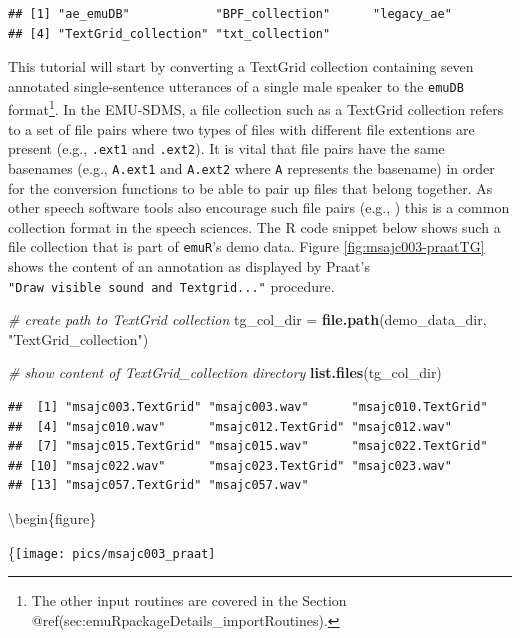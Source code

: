 \documentclass[]{book}
\newenvironment{Shaded}{\begin{snugshade}}{\end{snugshade}}
\newcommand{\CommentTok}[1]{\textcolor[rgb]{0.56,0.35,0.01}{\textit{#1}}}
\newcommand{\KeywordTok}[1]{\textcolor[rgb]{0.13,0.29,0.53}{\textbf{#1}}}
\newcommand{\NormalTok}[1]{#1}
\newcommand{\StringTok}[1]{\textcolor[rgb]{0.31,0.60,0.02}{#1}}
\let\rmarkdownfootnote\footnote%
\def\footnote{\protect\rmarkdownfootnote}
\begin{document}
\begin{verbatim}
## [1] "ae_emuDB"            "BPF_collection"      "legacy_ae"          
## [4] "TextGrid_collection" "txt_collection"
\end{verbatim}

This tutorial will start by converting a TextGrid collection containing seven annotated single-sentence utterances of a single male speaker to the \texttt{emuDB} format\footnote{The other input routines are covered in the Section @ref(sec:emuRpackageDetails\_importRoutines).}. In the EMU-SDMS, a file collection such as a TextGrid collection refers to a set of file pairs where two types of files with different file extentions are present (e.g., \texttt{.ext1} and \texttt{.ext2}). It is vital that file pairs have the same basenames (e.g., \texttt{A.ext1} and \texttt{A.ext2} where \texttt{A} represents the basename) in order for the conversion functions to be able to pair up files that belong together. As other speech software tools also encourage such file pairs (e.g., \citet{kisler:2015a}) this is a common collection format in the speech sciences. The R code snippet below shows such a file collection that is part of \texttt{emuR}'s demo data. Figure \ref{fig:msajc003-praatTG} shows the content of an annotation as displayed by Praat's \texttt{"Draw\ visible\ sound\ and\ Textgrid..."} procedure.

\begin{Shaded}
\begin{Highlighting}[]
\CommentTok{# create path to TextGrid collection}
\NormalTok{tg_col_dir =}\StringTok{ }\KeywordTok{file.path}\NormalTok{(demo_data_dir, }\StringTok{"TextGrid_collection"}\NormalTok{)}

\CommentTok{# show content of TextGrid_collection directory}
\KeywordTok{list.files}\NormalTok{(tg_col_dir)}
\end{Highlighting}
\end{Shaded}

\begin{verbatim}
##  [1] "msajc003.TextGrid" "msajc003.wav"      "msajc010.TextGrid"
##  [4] "msajc010.wav"      "msajc012.TextGrid" "msajc012.wav"     
##  [7] "msajc015.TextGrid" "msajc015.wav"      "msajc022.TextGrid"
## [10] "msajc022.wav"      "msajc023.TextGrid" "msajc023.wav"     
## [13] "msajc057.TextGrid" "msajc057.wav"
\end{verbatim}

\textbackslash{}begin\{figure\}

\{\centering \texttt{[image: pics/msajc003\_praat]}
\end{document}
